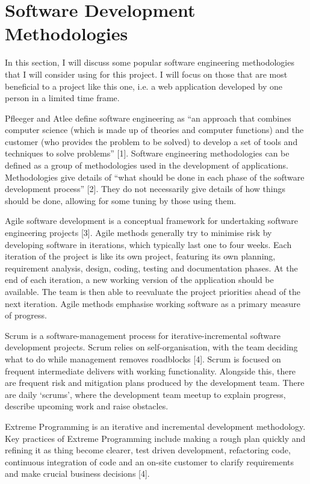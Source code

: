 \documentclass[authoryearcitations]{UoYCSproject}
\begin{document}
\section{Software Development Methodologies}

In this section, I will discuss some popular software engineering methodologies that I will consider using for this project. I will focus on those that are most beneficial to a project like this one, i.e. a web application developed by one person in a limited time frame. 

Pfleeger and Atlee define software engineering as “an approach that combines computer science (which is made up of theories and computer functions) and the customer (who provides the problem to be solved) to develop a set of tools and techniques to solve problems” [1]. Software engineering methodologies can be defined as a group of methodologies used in the development of applications. Methodologies give details of “what should be done in each phase of the software development process” [2]. They do not necessarily give details of how things should be done, allowing for some tuning by those using them. 

Agile software development is a conceptual framework for undertaking software engineering projects [3]. Agile methods generally try to minimise risk by developing software in iterations, which typically last one to four weeks. Each iteration of the project is like its own project, featuring its own planning, requirement analysis, design, coding, testing and documentation phases. At the end of each iteration, a new working version of the application should be available. The team is then able to reevaluate the project priorities ahead of the next iteration. Agile methods emphasise working software as a primary measure of progress.

Scrum is a software-management process for iterative-incremental software development projects. Scrum relies on self-organisation, with the team deciding what to do while management removes roadblocks [4]. Scrum is focused on frequent intermediate delivers with working functionality. Alongside this, there are frequent risk and mitigation plans produced by the development team. There are daily ‘scrums’, where the development team meetup to explain progress, describe upcoming work and raise obstacles. 

Extreme Programming is an iterative and incremental development methodology. Key practices of Extreme Programming include making a rough plan quickly and refining it as thing become clearer, test driven development, refactoring code, continuous integration of code and an on-site customer to clarify requirements and make crucial business decisions [4]. 
\end{document}
